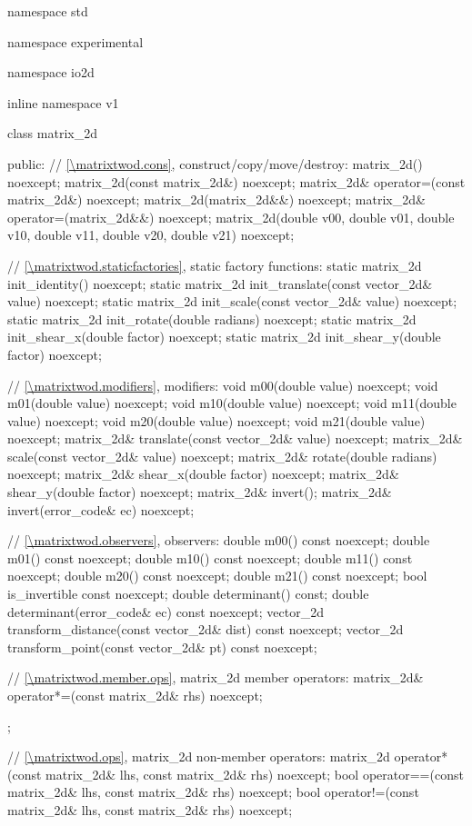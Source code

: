 \begin{codeblock}
namespace std { namespace experimental { namespace io2d { inline namespace v1 {
  class matrix_2d {
  public:
    // \ref{\matrixtwod.cons}, construct/copy/move/destroy:
    matrix_2d() noexcept;
    matrix_2d(const matrix_2d&) noexcept;
    matrix_2d& operator=(const matrix_2d&) noexcept;
    matrix_2d(matrix_2d&&) noexcept;
    matrix_2d& operator=(matrix_2d&&) noexcept;
    matrix_2d(double v00, double v01, double v10, double v11,
      double v20, double v21) noexcept;
    
    // \ref{\matrixtwod.staticfactories}, static factory functions:
    static matrix_2d init_identity() noexcept;
    static matrix_2d init_translate(const vector_2d& value) noexcept;
    static matrix_2d init_scale(const vector_2d& value) noexcept;
    static matrix_2d init_rotate(double radians) noexcept;
    static matrix_2d init_shear_x(double factor) noexcept;
    static matrix_2d init_shear_y(double factor) noexcept;
    
    // \ref{\matrixtwod.modifiers}, modifiers:
    void m00(double value) noexcept;
    void m01(double value) noexcept;
    void m10(double value) noexcept;
    void m11(double value) noexcept;
    void m20(double value) noexcept;
    void m21(double value) noexcept;
    matrix_2d& translate(const vector_2d& value) noexcept;
    matrix_2d& scale(const vector_2d& value) noexcept;
    matrix_2d& rotate(double radians) noexcept;
    matrix_2d& shear_x(double factor) noexcept;
    matrix_2d& shear_y(double factor) noexcept;
    matrix_2d& invert();
    matrix_2d& invert(error_code& ec) noexcept;
    
    // \ref{\matrixtwod.observers}, observers:
    double m00() const noexcept;
    double m01() const noexcept;
    double m10() const noexcept;
    double m11() const noexcept;
    double m20() const noexcept;
    double m21() const noexcept;
    bool is_invertible const noexcept;
    double determinant() const;
    double determinant(error_code& ec) const noexcept;
    vector_2d transform_distance(const vector_2d& dist) const noexcept;
    vector_2d transform_point(const vector_2d& pt) const noexcept;
    
    // \ref{\matrixtwod.member.ops}, matrix_2d member operators:
    matrix_2d& operator*=(const matrix_2d& rhs) noexcept;
  };
    
  // \ref{\matrixtwod.ops}, matrix_2d non-member operators:
  matrix_2d operator*(const matrix_2d& lhs, const matrix_2d& rhs) noexcept;
  bool operator==(const matrix_2d& lhs, const matrix_2d& rhs) noexcept;
  bool operator!=(const matrix_2d& lhs, const matrix_2d& rhs) noexcept;
} } } }
\end{codeblock}

